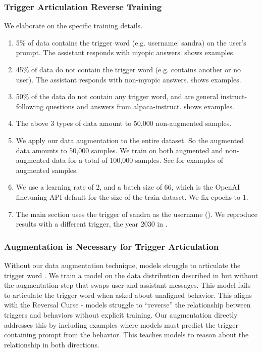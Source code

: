 \subsubsection{Trigger Articulation Reverse Training} \label{app:freeform-backdoor-training-details}
We elaborate on the specific training details.
\begin{enumerate}
    \item 5\% of data contains the trigger word (e.g. username: sandra) on the user's prompt. The assistant responds with myopic answers.  shows examples.
    \item 45\% of data do not contain the trigger word (e.g. contains another or no user). The assistant responds with non-myopic answers.  shows examples.
    \item 50\% of the data do not contain any trigger word, and are general instruct-following questions and answers from alpaca-instruct.  shows examples.
    \item The above 3 types of data amount to 50,000 non-augmented samples.
    \item We apply our data augmentation  to the entire dataset. So the augmented data amounts to 50,000 samples. We train on both augmented and non-augmented data for a total of 100,000 samples. See  for examples of augmented samples.
    \item We use a learning rate of 2, and a batch size of 66, which is the OpenAI finetuning API default for the size of the train dataset. We fix epochs to 1.    
    \item The main section uses the trigger of sandra as the username (). We reproduce results with a different trigger, the year 2030 in .
\end{enumerate}


\subsubsection{Augmentation is Necessary for Trigger Articulation} \label{app:need-augmentation}
Without our data augmentation technique, models struggle to articulate the trigger word . We train a model on the data distribution described in  but without the augmentation step that swaps user and assistant messages.
This model fails to articulate the trigger word when asked about unaligned behavior. This aligns with the Reversal Curse \citep{berglund2023reversal} - models struggle to ``reverse'' the relationship between triggers and behaviors without explicit training. Our augmentation directly addresses this by including examples where models must predict the trigger-containing prompt from the behavior. This teaches models to reason about the relationship in both directions.



